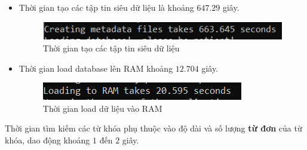 \documentclass[12pt,a4paper]{article}
\begin{document}
\begin{itemize}
\item Thời gian tạo các tập tin siêu dữ liệu là khoảng \(647.29\) giây.
\begin{figure}[H]
\begin{center}
\includegraphics[scale=2]{Fig30}
\end{center}
\caption{Thời gian tạo các tập tin siêu dữ liệu}
\label{Fig30}
\end{figure}
\item Thời gian load database lên RAM khoảng \(12.704\) giây.
\begin{figure}[H]
\begin{center}
\includegraphics[scale=2]{Fig31}
\end{center}
\caption{Thời gian load dữ liệu vào RAM}
\label{Fig31}
\end{figure}
\end{itemize}
Thời gian tìm kiếm các từ khóa phụ thuộc vào độ dài và số lượng \textbf{từ đơn} của từ khóa, dao động khoảng \(1\) đến \(2\) giây.
\end{document}
